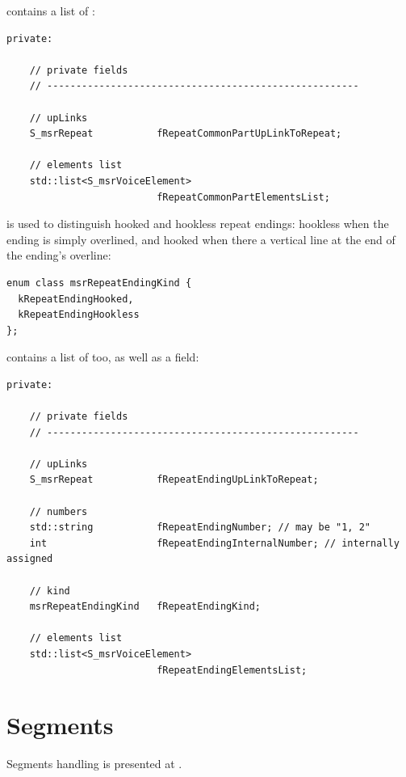  contains a list of :
\begin{lstlisting}[language=CPlusPlus]
  private:

    // private fields
    // ------------------------------------------------------

    // upLinks
    S_msrRepeat           fRepeatCommonPartUpLinkToRepeat;

    // elements list
    std::list<S_msrVoiceElement>
                          fRepeatCommonPartElementsList;
\end{lstlisting}

 is used to distinguish hooked and hookless repeat endings: hookless when the ending is simply overlined, and hooked when there a vertical line at the end of the ending's overline:
\begin{lstlisting}[language=CPlusPlus]
enum class msrRepeatEndingKind {
  kRepeatEndingHooked,
  kRepeatEndingHookless
};
\end{lstlisting}

 contains a list of  too, as well as a  field:
\begin{lstlisting}[language=CPlusPlus]
  private:

    // private fields
    // ------------------------------------------------------

    // upLinks
    S_msrRepeat           fRepeatEndingUpLinkToRepeat;

    // numbers
    std::string           fRepeatEndingNumber; // may be "1, 2"
    int                   fRepeatEndingInternalNumber; // internally assigned

    // kind
    msrRepeatEndingKind   fRepeatEndingKind;

    // elements list
    std::list<S_msrVoiceElement>
                          fRepeatEndingElementsList;
\end{lstlisting}


\section{Segments}\label{Segments}

Segments handling is presented at .

